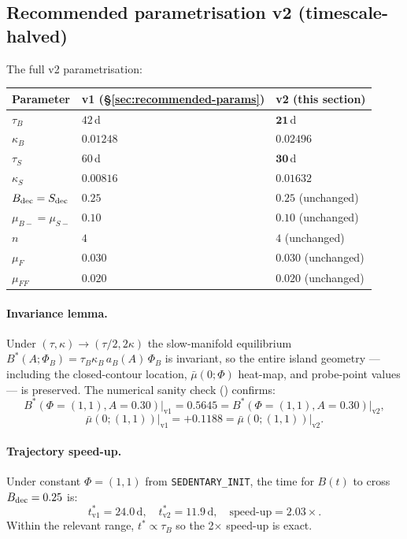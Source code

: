 \documentclass[11pt,a4paper]{article}
\theoremstyle{definition}
\begin{document}
\subsection{Recommended parametrisation v2 (timescale-halved)}

The full v2 parametrisation:
\begin{center}\small
\begin{tabular}{lll}
\toprule
Parameter & v1 (\S\ref{sec:recommended-params}) & \textbf{v2 (this section)} \\
\midrule
$\tau_B$         & $42$\,d & $\boldsymbol{21}$\,d \\
$\kappa_B$       & $0.01248$ & $\boldsymbol{0.02496}$ \\
$\tau_S$         & $60$\,d & $\boldsymbol{30}$\,d \\
$\kappa_S$       & $0.00816$ & $\boldsymbol{0.01632}$ \\
$B_{\rm dec} = S_{\rm dec}$ & $0.25$ & $0.25$ (unchanged) \\
$\mu_{B-} = \mu_{S-}$        & $0.10$ & $0.10$ (unchanged) \\
$n$                           & $4$ & $4$ (unchanged) \\
$\mu_F$                       & $0.030$ & $0.030$ (unchanged) \\
$\mu_{FF}$                    & $0.020$ & $0.020$ (unchanged) \\
\bottomrule
\end{tabular}
\end{center}

\paragraph{Invariance lemma.} Under $(\tau, \kappa) \to (\tau / 2, 2\kappa)$ the slow-manifold equilibrium $B^*(A; \Phi_B) = \tau_B \kappa_B \, a_B(A) \, \Phi_B$ is invariant, so the entire island geometry — including the closed-contour location, $\bar\mu(0; \Phi)$ heat-map, and probe-point values — is preserved. The numerical sanity check () confirms:
\[
B^*(\Phi = (1, 1), A = 0.30) \big|_{\text{v1}} = 0.5645 = B^*(\Phi = (1, 1), A = 0.30) \big|_{\text{v2}},
\]
\[
\bar\mu(0; (1, 1)) \big|_{\text{v1}} = +0.1188 = \bar\mu(0; (1, 1)) \big|_{\text{v2}}.
\]

\paragraph{Trajectory speed-up.} Under constant $\Phi = (1, 1)$ from \texttt{SEDENTARY\_INIT}, the time for $B(t)$ to cross $B_{\rm dec} = 0.25$ is:
\[
t^*_{\text{v1}} = 24.0\,\text{d}, \quad t^*_{\text{v2}} = 11.9\,\text{d}, \quad \text{speed-up} = 2.03\times.
\]
Within the relevant range, $t^* \propto \tau_B$ so the 2× speed-up is exact.
\end{document}
